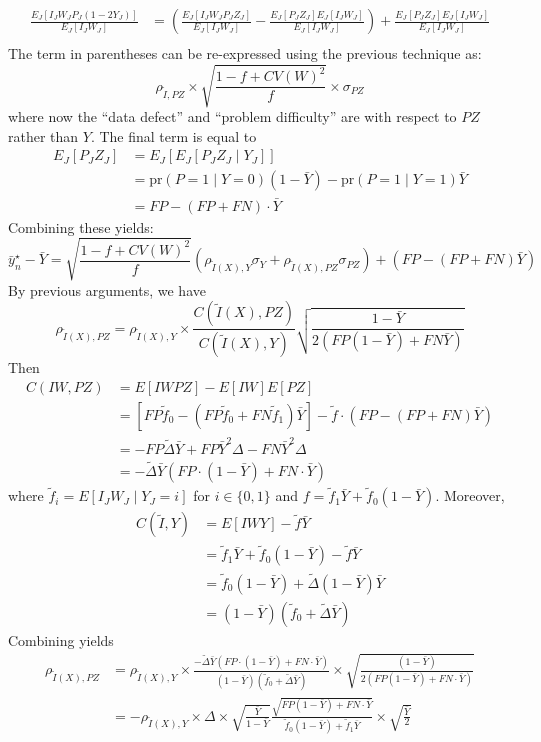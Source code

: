 \documentclass[11pt]{amsart}
\numberwithin{equation}{section}
\theoremstyle{plain}
\def\pr{\text{pr}}
\begin{document}
$$
\begin{aligned}
\frac{E_J \left[ I_J W_J P_J (1-2Y_J) \right]}{E_J [ I_J W_J ] } &= \left( \frac{E_J \left[ I_J W_J P_J Z_J \right]}{E_J [ I_J W_J ] } -  \frac{E_J \left[ P_J Z_J \right] E_J[ I_J W_J]}{E_J [ I_J W_J ] } \right) +  \frac{E_J \left[ P_J Z_J \right] E_J[ I_J W_J]}{E_J [ I_J W_J ] } \\
\end{aligned}
$$
The term in parentheses can be re-expressed using the previous technique as:
$$
\rho_{\tilde I, PZ} \times \sqrt{\frac{1-f+CV(W)^2}{f}} \times \sigma_{PZ}
$$
where now the ``data defect'' and ``problem difficulty'' are with respect to $PZ$ rather than $Y$. The final term is equal to
$$
\begin{aligned}
E_J [P_J Z_J ] &= E_J [ E_J [ P_J Z_J \mid Y_J ] ] \\
&= \pr (P = 1 \mid Y = 0) (1-\bar Y) - \pr(P=1 \mid Y = 1) \bar Y \\
&= FP - (FP + FN) \cdot \bar Y
\end{aligned}
$$
Combining these yields:
$$
\bar y_n^\star - \bar Y = \sqrt{\frac{1-f+CV(W)^2}{f}} \left(\rho_{\tilde I(X),Y} \sigma_Y + \rho_{\tilde I(X), PZ} \sigma_{PZ} \right) + \left( FP - (FP+FN) \bar Y \right)
$$
By previous arguments, we have
$$
\rho_{\tilde I (X), PZ} = \rho_{\tilde I(X), Y} \times \frac{C(\tilde I(X), PZ)}{C(\tilde I(X), Y)} \sqrt{ \frac{1-\bar Y}{ 2 (FP(1-\bar Y) + FN \bar Y)} }
$$
Then
\begin{align*}
C(IW, PZ) &= E[IWPZ] - E[IW] E[PZ] \\
&=  [FP \tilde f_0  - (FP \tilde f_0 + FN \tilde f_1) \bar Y]  - \tilde f \cdot ( FP - (FP+FN) \bar Y )\\
&= -FP \tilde \Delta \bar Y + FP \bar Y^2 \Delta - FN \bar Y^2 \Delta \\
&= -\tilde \Delta \bar Y ( FP \cdot (1-\bar Y) + FN \cdot \bar Y)
\end{align*}
where $\tilde f_i = E[ I_J W_J \mid Y_J = i]$ for $i \in \{0,1 \}$ and $f = \tilde f_1 \bar Y + \tilde f_0 (1-\bar Y)$. Moreover,
\begin{align*}
C(\tilde I,Y) &= E[ I W Y ] - \tilde f \bar Y \\
&= \tilde f_1 \bar Y + \tilde f_0 (1-\bar Y) - \tilde f \bar Y \\
&= \tilde f_0 (1-\bar Y) + \tilde \Delta (1-\bar Y) \bar Y \\
&= (1- \bar Y) (\tilde f_0 + \tilde \Delta \bar Y)
\end{align*}
Combining yields
$$
\begin{aligned}
\rho_{\tilde I (X),PZ} &= \rho_{\tilde I(X),Y} \times \frac{- \tilde \Delta \bar Y (FP \cdot (1-\bar Y) + FN \cdot \bar Y) }{(1-\bar Y) (\tilde f_0 + \tilde \Delta \bar Y)} \times \sqrt{ \frac{(1-\bar Y)}{2 ( FP (1-\bar Y) + FN \cdot \bar Y)} } \\
&= - \rho_{\tilde I(X), Y} \times \Delta \times \sqrt{\frac{\bar Y}{1-\bar Y}} \frac{\sqrt{FP(1-\bar Y) + FN \cdot \bar Y}}{\tilde f_0 (1-\bar Y) + \tilde f_1 \bar Y} \times \sqrt{\frac{\bar Y}{2}}
\end{aligned}
$$
\end{document}
